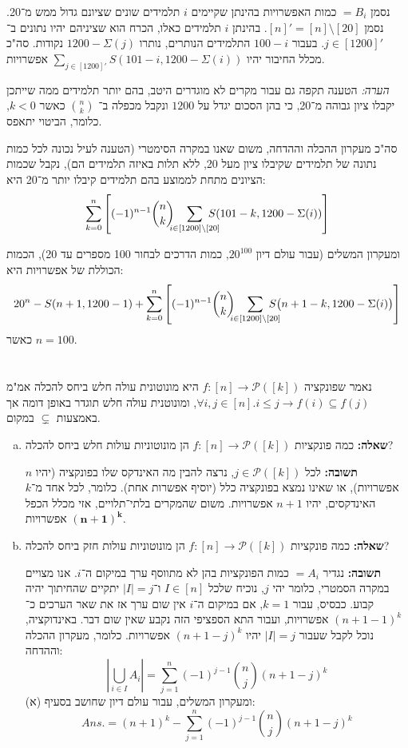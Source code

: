 \documentclass[]{article}
\newcommand\ps    {\mathcal{P}}
\newcommand\sso   {\rightarrow}
\newcommand\ans   {\mathit{Ans.}}
\newcommand\sumnk     {\sum_{k = 0}^{n}}
\newcommand\bink      {\binom{n}{k}}
\newcommand\cupiiai   {\bigcup_{i \in I} A_i}
\newcommand\sof[1]    {\left | #1 \right |}
\begin{document}
		נסמן $= B_i$ כמות האפשרויות בהינתן שקיימים $i$ תלמידים שונים שציונם גדול ממש מ־20. נסמן $[n]' = [n] \setminus [20]$. בהינתן $i$ תלמידים כאלו, הכרח הוא שציניהם יהיו נתונים ב־$j \in [1200]'$. בעבור $ 100 - i $ התלמידים הנותרים, נותרו $ 1200 - \Sigma(j)$ נקודות. סה"כ מכלל החיבור יהיו $\sum_{j \in [1200]'} S(101 - i, 1200 - \Sigma(i))$ אפשרויות. 
		
		\textit{הערה: }הטענה תקפה גם עבור מקרים לא מוגדרים היטב, בהם יותר תלמידים ממה שייתכן יקבלו ציון גבוהה מ־20, כי בהן הסכום יגדל על $1200$ ונקבל מכפלה ב־ $\bink$ כאשר $k < 0$, כלומר, הביטוי יתאפס. 
		
		סה"כ מעקרון ההכלה וההדחה, משום שאנו במקרה הסימטרי (הטענה לעיל נכונה לכל כמות נתונה של תלמידים שקיבלו ציון מעל 20, ללא תלות באיזה תלמידים הם), נקבל שכמות הציונים מתחת לממוצע בהם תלמידים קיבלו יותר מ־20 היא: 
		\[ \sumnk \left [ (-1)^{n - 1} \bink \ \ \; \sum_{\mathclap{i \in [1200] \setminus [20]}} \ S(101 - k, 1200 - \Sigma(i)) \right ] \]
		
		ומעקרון המשלים (עבור עולם דיון $ 20^{100 }$, כמות הדרכים לבחור 100 מספרים עד 20), הכמות הכוללת של אפשרויות היא: 
		\[ 20^{n} - S(n + 1, 1200 - 1) + \sumnk \left [ (-1)^{n - 1} \bink \ \ \; \sum_{\mathclap{i \in [1200] \setminus [20]}} \ S\big(n + 1 - k, 1200 - \Sigma(i)\big) \right ] \]
		כאשר $n = 100 $. 
	
	\section{} %
	נאמר שפונקציה $f \colon [n] \to \ps([k])$ היא מונוטונית עולה חלש ביחס להכלה אמ"מ $\forall i, j \in [n]. i \le j \sso f(i) \subseteq f(j)$, ומונוטנית עולה חלש תוגדר באופן דומה אך באמצעות $\subsetneq$ במקום. 
	\begin{enumerate}[(a)]
		\item \textbf{שאלה: }כמה פונקציות $f \colon [n] \to \ps([k])$ הן מונוטוניות עולות חלש ביחס להכלה?
		
		\textbf{תשובה: }לכל $j \in \ps([k])$, נרצה להבין מה האינדקס שלו בפונקציה (יהיו $n$ אפשרויות), או שאינו נמצא בפונקציה כלל (יוסיף אפשרות אחת). כלומר, לכל אחד מ־$k$ האינדקסים, יהיו $n + 1$ אפשרויות. משום שהמקרים בלתי־תלויים, אזי מכלל הכפל $\bm{(n + 1)^k}$ אפשרויות.
		
		\item \textbf{שאלה: }כמה פונקציות $f \colon [n] \to \ps([k])$ הן מונוטוניות עולות חזק ביחס להכלה? 
		
		\textbf{תשובה: }נגדיר $= A_i$ כמות הפונקציות בהן לא מתווסף ערך במיקום ה־$i$. אנו מצויים במקרה הסמטרי, כלומר יהי $j$, נוכיח שלכל $I \in [n]$ ו־$|I| = j$ יתקיים שהחיתוך יהיה קבוע. כבסיס, עבור $k = 1$, אם במיקום ה־$i$ אין שום ערך אז את שאר הערכים כ־$(n + 1 - 1)^k$ אפשרויות, ועבור התא הספציפי הזה נקבע שאין שום דבר. באינדוקציה, נוכל לקבל שעבור $|I| = j$ יהיו $(n + 1 - j)^k$ אפשרויות. כלומר, מעקרון ההכלה וההדחה: 
		\[ \sof{\cupiiai} = \sum_{j = 1}^{n} (-1)^{j - 1} \binom{n}{j} (n + 1 - j)^k \]
		ומעקרון המשלים, עבור עולם דיון שחושב בסעיף (א): 
		\[ \ans = (n + 1)^k - \sum_{j = 1}^{n} (-1)^{j - 1} \binom{n}{j} (n + 1 - j)^k \]
	\end{enumerate}
	
\end{document}
